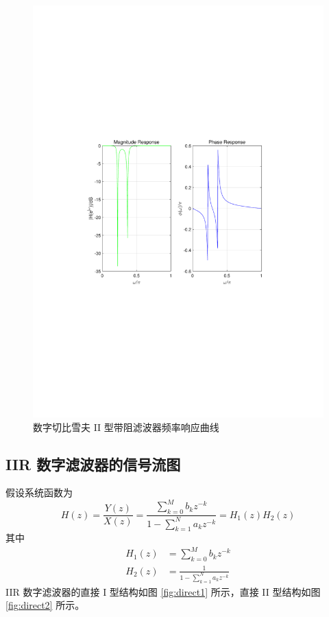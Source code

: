 \documentclass[12pt,AutoFakeBold]{article}
\begin{document}
\begin{figure}[hbtp]
	\centering
	\includegraphics[width=14cm]{figure/BSC2F.pdf}
	\caption{数字切比雪夫 II 型带阻滤波器频率响应曲线} \label{fig:BSC2F}
\end{figure}

\subsection{IIR 数字滤波器的信号流图}


假设系统函数为
%
\begin{equation}
H(z)=\frac{Y(z)}{X(z)}=\frac{\displaystyle\sum_{k=0}^Mb_kz^{-k}}{1-\displaystyle\sum_{k=1}^Na_kz^{-k}}=H_1(z)H_2(z)
\end{equation}
%
其中
%
\begin{align}
H_1(z) &= \sum_{k=0}^Mb_kz^{-k} \\
H_2(z) &= \frac{1}{1-\displaystyle\sum_{k=1}^Na_kz^{-k}}
\end{align}
%
IIR 数字滤波器的直接 I 型结构如图 \ref{fig:direct1} 所示，直接 II 型结构如图 \ref{fig:direct2} 所示。
\end{document}
